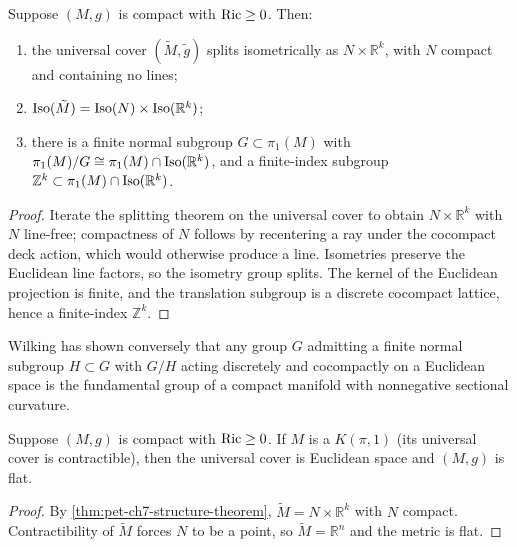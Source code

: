\begin{theorem}
  \label{thm:pet-ch7-structure-theorem}

  Suppose $(M,g)$ is compact with $\operatorname{Ric}\ge0$. Then:
  \begin{enumerate}
    \item[(1)] the universal cover $(\tilde M,\tilde g)$ splits isometrically
      as $N\times\mathbb{R}^k$, with $N$ compact and containing no lines;
    \item[(2)] $\mathrm{Iso}(\tilde M)=\mathrm{Iso}(N)\times\mathrm{Iso}(\mathbb{R}^k)$;
    \item[(3)] there is a finite normal subgroup $G\subset\pi_1(M)$ with
      $\pi_1(M)/G\cong\pi_1(M)\cap\mathrm{Iso}(\mathbb{R}^k)$, and a finite-index subgroup
      $\mathbb{Z}^k\subset\pi_1(M)\cap\mathrm{Iso}(\mathbb{R}^k)$.
  \end{enumerate}
\end{theorem}
\begin{proof}
  \sketch
  Iterate the splitting theorem on the universal cover to obtain \(N\times\mathbb R^k\) with \(N\) line-free; compactness of \(N\) follows by recentering a ray under the cocompact deck action, which would otherwise produce a line. Isometries preserve the Euclidean line factors, so the isometry group splits. The kernel of the Euclidean projection is finite, and the translation subgroup is a discrete cocompact lattice, hence a finite-index \(\mathbb Z^k\).
\end{proof}

\begin{remark}
  \label{rem:pet-ch7-wilking-remark}

  Wilking has shown conversely that any group $G$ admitting a finite normal
  subgroup $H\subset G$ with $G/H$ acting discretely and cocompactly on a
  Euclidean space is the fundamental group of a compact manifold with
  nonnegative sectional curvature.
\end{remark}

\begin{corollary}
  \label{cor:pet-ch7-flat-manifold-Kpi1}

  Suppose $(M,g)$ is compact with $\operatorname{Ric}\ge0$. If $M$ is a $K(\pi,1)$ (its
  universal cover is contractible), then the universal cover is Euclidean
  space and $(M,g)$ is flat.
\end{corollary}
\begin{proof}
  \sketch
  By \cref{thm:pet-ch7-structure-theorem}, \(\widetilde M=N\times\mathbb R^k\) with \(N\) compact. Contractibility of \(\widetilde M\) forces \(N\) to be a point, so \(\widetilde M=\mathbb R^n\) and the metric is flat.
\end{proof}

